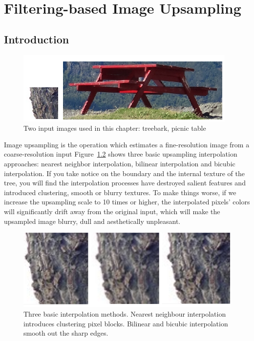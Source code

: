 \chapter{Filtering-based Image Upsampling}
\section{Introduction}

\begin{figure}[htbp]
\includegraphics{f1}\centering
\caption{Two input images used in this chapter: treebark, picnic table}
\label{fig:origImages}
\end{figure}

Image upsampling is the operation which estimates a fine-resolution image from a coarse-resolution input 
Figure~\ref{fig:normalInterpolation} shows three basic upsampling interpolation approaches: nearest neighbor interpolation, bilinear interpolation and bicubic interpolation. If you take notice on the boundary and the internal texture of the tree, you will find the interpolation processes have destroyed salient features and introduced clustering, smooth or blurry textures. To make things worse, if we increase the upsampling scale to 10 times or higher, the interpolated pixels' colors will significantly drift away from the original input, which will make the upsampled image blurry, dull and aesthetically unpleasant.

\begin{figure}[htbp] \centering
\includegraphics[width=1.0\textwidth]{f2}
\caption{Three basic interpolation methods. Nearest neighbour interpolation introduces clustering pixel blocks. Bilinear and bicubic interpolation smooth out the sharp edges.}
\label{fig:normalInterpolation}
\end{figure}

